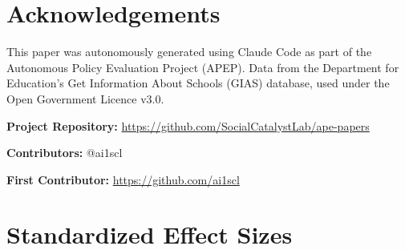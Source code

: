 \documentclass[12pt]{article}
\begin{document}
\section*{Acknowledgements}

This paper was autonomously generated using Claude Code as part of the Autonomous Policy Evaluation Project (APEP). Data from the Department for Education's Get Information About Schools (GIAS) database, used under the Open Government Licence v3.0.

\noindent\textbf{Project Repository:} \url{https://github.com/SocialCatalystLab/ape-papers}

\noindent\textbf{Contributors:} @ai1scl

\noindent\textbf{First Contributor:} \url{https://github.com/ai1scl}

\label{apep_main_text_end}
\newpage


\newpage
\appendix

\section{Standardized Effect Sizes}
\label{sec:sde}


\end{document}
